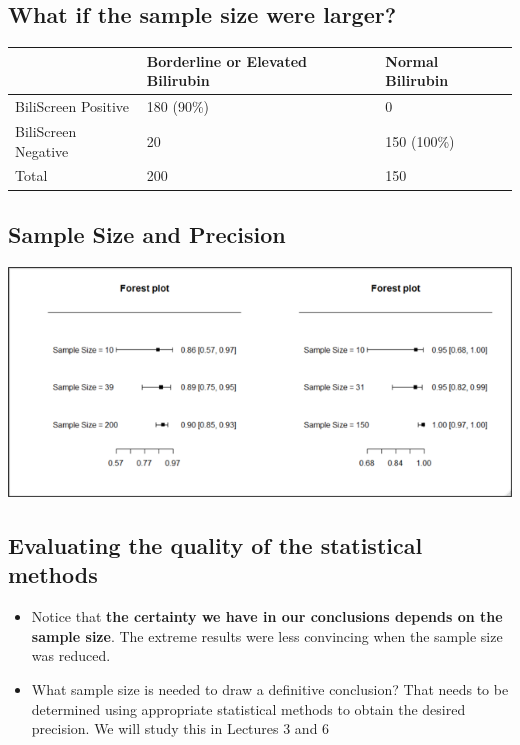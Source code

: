 \documentclass[
]{book}
\providecommand{\tightlist}{%
  \setlength{\itemsep}{0pt}\setlength{\parskip}{0pt}}
\begin{document}
\hypertarget{what-if-the-sample-size-were-larger}{%
\subsection{What if the sample size were larger?}\label{what-if-the-sample-size-were-larger}}

\begin{tabular}{l|l|l}
\hline
  & Borderline or Elevated Bilirubin & Normal Bilirubin\\
\hline
BiliScreen Positive & 180 (90\%) & 0\\
\hline
BiliScreen Negative & 20 & 150 (100\%)\\
\hline
Total & 200 & 150\\
\hline
\end{tabular}

\hypertarget{sample-size-and-precision}{%
\subsection{Sample Size and Precision}\label{sample-size-and-precision}}

\includegraphics[width=1\linewidth]{./1_16}

\hypertarget{evaluating-the-quality-of-the-statistical-methods-1}{%
\subsection{Evaluating the quality of the statistical methods}\label{evaluating-the-quality-of-the-statistical-methods-1}}

\begin{itemize}
\tightlist
\item
  Notice that \textbf{the certainty we have in our conclusions depends on the sample size}. The extreme results were less convincing when the sample size was reduced.
\item
  What sample size is needed to draw a definitive conclusion? That needs to be determined using appropriate statistical methods to obtain the desired precision. We will study this in Lectures 3 and 6
\end{itemize}
\end{document}
